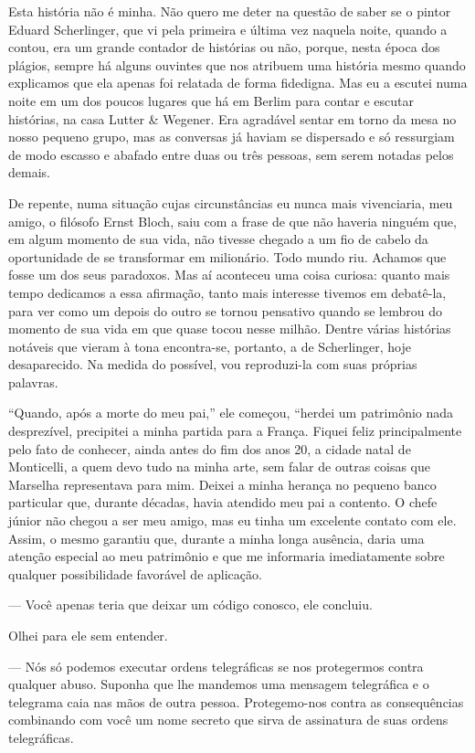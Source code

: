 Esta história não é minha. Não quero me deter na questão de saber se o
pintor Eduard Scherlinger, que vi pela primeira e última vez naquela
noite, quando a contou, era um grande contador de histórias ou não,
porque, nesta época dos plágios, sempre há alguns ouvintes que nos
atribuem uma história mesmo quando explicamos que ela apenas foi
relatada de forma fidedigna. Mas eu a escutei numa noite em um dos
poucos lugares que há em Berlim para contar e escutar histórias, na casa
Lutter \& Wegener. Era agradável sentar em torno da mesa no nosso
pequeno grupo, mas as conversas já haviam se dispersado e só ressurgiam
de modo escasso e abafado entre duas ou três pessoas, sem serem notadas
pelos demais.

De repente, numa situação cujas circunstâncias eu nunca mais
vivenciaria, meu amigo, o filósofo Ernst Bloch, saiu com a frase de que
não haveria ninguém que, em algum momento de sua vida, não tivesse
chegado a um fio de cabelo da oportunidade de se transformar em
milionário. Todo mundo riu. Achamos que fosse um dos seus paradoxos. Mas
aí aconteceu uma coisa curiosa: quanto mais tempo dedicamos a essa
afirmação, tanto mais interesse tivemos em debatê-la, para ver como um
depois do outro se tornou pensativo quando se lembrou do momento de sua
vida em que quase tocou nesse milhão. Dentre várias histórias notáveis
que vieram à tona encontra-se, portanto, a de Scherlinger, hoje
desaparecido. Na medida do possível, vou reproduzi-la com suas próprias
palavras.

``Quando, após a morte do meu pai,'' ele começou, ``herdei um patrimônio
nada desprezível, precipitei a minha partida para a França. Fiquei feliz
principalmente pelo fato de conhecer, ainda antes do fim dos anos 20, a
cidade natal de Monticelli, a quem devo tudo na minha arte, sem falar de
outras coisas que Marselha representava para mim. Deixei a minha herança
no pequeno banco particular que, durante décadas, havia atendido meu pai
a contento. O chefe júnior não chegou a ser meu amigo, mas eu tinha um
excelente contato com ele. Assim, o mesmo garantiu que, durante a minha
longa ausência, daria uma atenção especial ao meu patrimônio e que me
informaria imediatamente sobre qualquer possibilidade favorável de
aplicação.

--- Você apenas teria que deixar um código conosco, ele concluiu.

Olhei para ele sem entender.

--- Nós só podemos executar ordens telegráficas se nos protegermos contra
qualquer abuso. Suponha que lhe mandemos uma mensagem telegráfica e o
telegrama caia nas mãos de outra pessoa. Protegemo-nos contra as
consequências combinando com você um nome secreto que sirva de
assinatura de suas ordens telegráficas.

